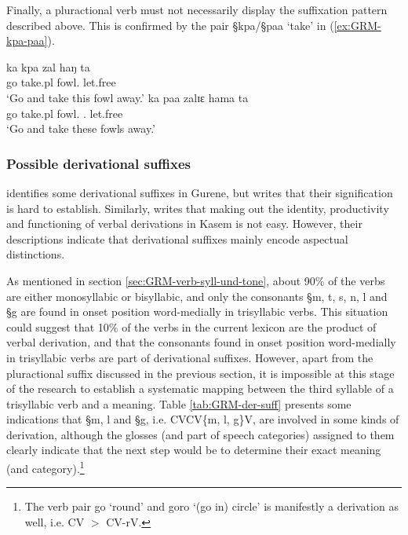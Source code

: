 Finally, a pluractional verb must not necessarily display the
suffixation pattern
described above. This is confirmed by the pair {\S kpa}/{\S paa} `take'  in
(\ref{ex:GRM-kpa-paa}).

\begin{exe}
    \ex\label{ex:GRM-kpa-paa}
  \begin{xlist}
    \ex\label{ex:GRM-kpa}
\gll ka kpa zal haŋ ta\\
go take.{\sc pl} fowl.{\sg} {\dem} let.free\\
\glt `Go and take this fowl away.'
      \ex\label{ex:GRM-paa}
\gll ka paa zalɪɛ hama ta\\
go take.{\sc pl} fowl.{\pl} {\dem}.{\pl}  let.free\\
\glt `Go and take these fowls away.'
 \end{xlist}
\end{exe}



\subsubsection{Possible derivational suffixes}
\label{sec:GRM-deri-suff}

 \citet[37]{Daku09} identifies some derivational suffixes in
Gurene, but writes that their signification is hard to establish. Similarly,
\citet[69]{Bonv88} writes that making out the identity, productivity and
functioning of verbal derivations in Kasem is not easy. However,
their descriptions indicate that  derivational suffixes mainly encode aspectual
distinctions.

As mentioned in section \ref{sec:GRM-verb-syll-und-tone}, about 90\% of the
verbs are either monosyllabic or bisyllabic, and  only the consonants {\S m,
t, s, n,  l} and {\S g} are found  in onset position word-medially in
trisyllabic verbs. This situation could suggest that 10\% of the verbs in the
current lexicon are the product of verbal derivation, and that the consonants
found  in onset position word-medially in trisyllabic verbs are part of
derivational suffixes. However, apart from the pluractional suffix discussed in
the previous section,  it is impossible at this stage of the research to
establish a systematic mapping between the third syllable of a trisyllabic verb
and a meaning. Table \ref{tab:GRM-der-suff}
presents  some indications that {\S m, l} and {\S g}, i.e. CVCV\{m, l, g\}V,
are involved in some kinds of derivation, although the glosses (and part of
speech categories) assigned to them clearly indicate that the next step would be
to determine their exact meaning (and category).\footnote{The verb pair {\F
go} `round'  and {\F goro}  `(go in) circle'  is  manifestly a derivation as
well, i.e.
CV $>$ CV-rV.} 



